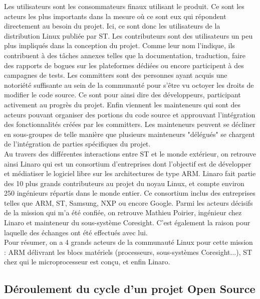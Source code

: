 Les utilisateurs sont les consommateurs finaux utilisant le produit. Ce sont
les acteurs les plus importants dans la mesure où ce sont eux qui répondent
directement au besoin du projet. Ici, ce sont donc les utilisateurs de la
distribution Linux publiée par ST. Les contributeurs sont des utilisateurs un
peu plus impliqués dans la conception du projet. Comme leur nom l'indique, ils
contribuent à des tâches annexes telles que la documentation, traduction,
faire des rapports de bogues sur les plateformes dédiées ou encore participent
à des campagnes de tests. Les committers sont des personnes ayant acquis une
notoriété suffisante au sein de la communauté pour s'être vu octoyer les
droits de modifier le code source. Ce sont pour ainsi dire des développeurs,
participant activement au progrès du projet. Enfin viennent les mainteneurs
qui sont des acteurs pouvant organiser des portions du code source et
approuvant l'intégration des fonctionnalités créées par les committers. Les
mainteneurs peuvent se décliner en sous-groupes de telle manière que plusieurs
mainteneurs "délégués" se chargent de l'intégration de parties spécifiques du
projet. \\

Au travers des différentes interactions entre ST et le monde extérieur, on
retrouve ainsi Linaro qui est un consortium d'entreprises dont l'objectif est
de développer et médiatiser le logiciel libre sur les architectures de type
ARM.  Linaro fait partie des 10 plus grands contributeurs au projet du noyau
Linux, et compte environ 250 ingénieurs répartis dans le monde entier. Ce
consortium inclus des entreprises telles que ARM, ST, Samsung, NXP ou encore
Google.  Parmi les acteurs décisifs de la mission qui m'a été confiée, on
retrouve Mathieu Poirier, ingénieur chez Linaro et mainteneur du sous-système
Coresight. C'est également la raison pour laquelle des échanges ont été
effectués avec lui. \\

Pour résumer, on a 4 grands acteurs de la communauté Linux pour cette mission
: ARM délivrant les blocs matériels (processeurs, sous-systèmes Coresight...),
ST chez qui le microprocesseur est conçu, et enfin Linaro. \\

\subsection{Déroulement du cycle d'un projet Open Source}

